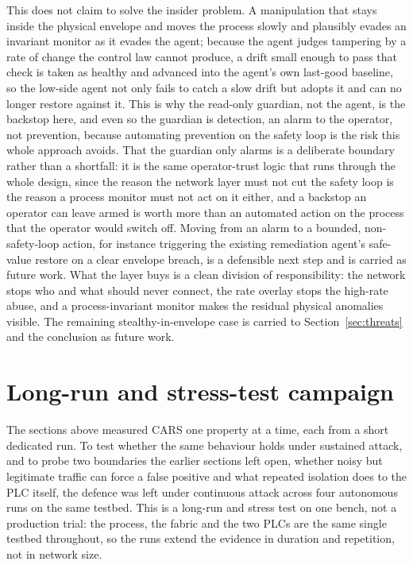 This does not claim to solve the insider problem. A manipulation that stays inside the physical envelope and moves the process slowly and plausibly evades an invariant monitor as it evades the agent; because the agent judges tampering by a rate of change the control law cannot produce, a drift small enough to pass that check is taken as healthy and advanced into the agent's own last-good baseline, so the low-side agent not only fails to catch a slow drift but adopts it and can no longer restore against it. This is why the read-only guardian, not the agent, is the backstop here, and even so the guardian is detection, an alarm to the operator, not prevention, because automating prevention on the safety loop is the risk this whole approach avoids. That the guardian only alarms is a deliberate boundary rather than a shortfall: it is the same operator-trust logic that runs through the whole design, since the reason the network layer must not cut the safety loop is the reason a process monitor must not act on it either, and a backstop an operator can leave armed is worth more than an automated action on the process that the operator would switch off. Moving from an alarm to a bounded, non-safety-loop action, for instance triggering the existing remediation agent's safe-value restore on a clear envelope breach, is a defensible next step and is carried as future work. What the layer buys is a clean division of responsibility: the network stops who and what should never connect, the rate overlay stops the high-rate abuse, and a process-invariant monitor makes the residual physical anomalies visible. The remaining stealthy-in-envelope case is carried to Section~\ref{sec:threats} and the conclusion as future work.

\section{Long-run and stress-test campaign}
\label{sec:evallongrun}

The sections above measured CARS one property at a time, each from a short dedicated run. To test whether the same behaviour holds under sustained attack, and to probe two boundaries the earlier sections left open, whether noisy but legitimate traffic can force a false positive and what repeated isolation does to the PLC itself, the defence was left under continuous attack across four autonomous runs on the same testbed. This is a long-run and stress test on one bench, not a production trial: the process, the fabric and the two PLCs are the same single testbed throughout, so the runs extend the evidence in duration and repetition, not in network size.


